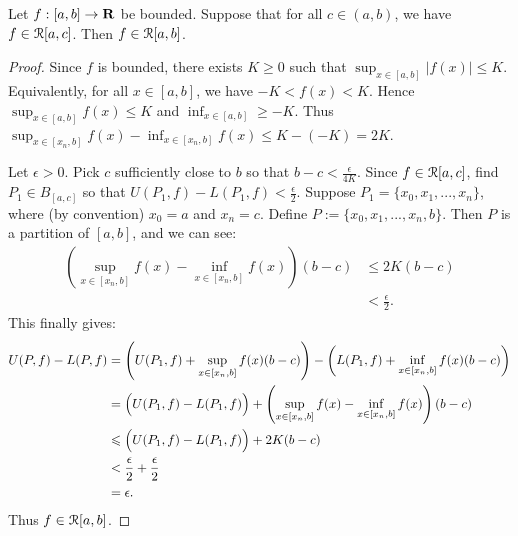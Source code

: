 \documentclass[11pt,twoside,openany]{memoir}
\begin{document}
    \begin{theorem}\label{thm:locally-inte}
        Let $f:[a,b] \rightarrow \bfR$ be bounded. Suppose that for all $c \in (a,b)$, we have $f \in \cR[a,c]$. Then $f \in \cR[a,b]$.
    \end{theorem}
        \begin{proof}
            Since $f$ is bounded, there exists $K \geq 0$ such that $\sup_{x \in [a,b]}|f(x)| \leq K$. Equivalently, for all $x \in [a,b]$, we have $-K < f(x) < K$. Hence $\sup_{x \in [a,b]}f(x) \leq K$ and $\inf_{x \in [a,b]} \geq -K$. Thus $\sup_{x \in [x_n,b]}f(x) - \inf_{x \in [x_n,b]}f(x) \leq K - (-K) = 2K$.
            
            Let $\epsilon > 0$. Pick $c$ sufficiently close to $b$ so that $b - c < \frac{\epsilon}{4K}$. Since $f \in \cR[a,c]$, find $P_1 \in B_{[a,c]}$ so that $U(P_1,f) - L(P_1,f) < \frac{\epsilon}{2}$. Suppose $P_1 = \{x_0,x_1,...,x_n\}$, where (by convention) $x_0 = a$ and $x_n = c$. Define $P := \{x_0,x_1,...,x_n,b\}$. Then $P$ is a partition of $[a,b]$, and we can see:
                \begin{equation*}
                \begin{split}
                    \left(\sup_{x \in [x_n,b]}f(x) - \inf_{x \in [x_n,b]}f(x)\right)(b-c)
                    & \leq 2K(b-c) \\
                    & < \frac{\epsilon}{2}.
                \end{split}
                \end{equation*} 
            This finally gives:
                \begin{equation*}
                \begin{split}
                    U(P,f) - L(P,f)
                    & = \left(U(P_1,f) + \sup_{x \in [x_n,b]}f(x)(b-c)\right) - \left(L(P_1,f) + \inf_{x \in [x_n,b]}f(x)(b-c)\right) \\
                    & = \Bigl( U(P_1,f) - L(P_1,f) \Bigr) + \left(\sup_{x \in [x_n,b]}f(x) - \inf_{x \in [x_n,b]}f(x)\right)(b-c) \\
                    & \leq \Bigl( U(P_1,f) - L(P_1,f) \Bigr) + 2K(b-c) \\
                    & < \frac{\epsilon}{2} + \frac{\epsilon}{2} \\
                    & = \epsilon.
                \end{split}
                \end{equation*}
            Thus $f \in \cR[a,b]$.
        \end{proof}
\end{document}
